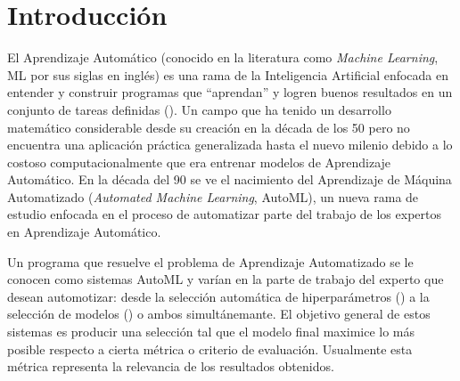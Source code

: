\chapter*{Introducción}\label{chapter:introduction}


El Aprendizaje Autom\'atico (conocido en la literatura como \textit{Machine Learning}, ML por sus siglas en ingl\'es) es una rama de la Inteligencia Artificial enfocada en entender y construir programas que ``aprendan'' y logren buenos resultados en un conjunto de tareas definidas (\cite{mitchell1990machine}). Un campo que ha tenido un desarrollo matem\'atico considerable desde su creaci\'on en la d\'ecada de los 50 pero no encuentra una aplicaci\'on pr\'actica generalizada hasta el nuevo milenio debido a lo costoso computacionalmente que era entrenar modelos de Aprendizaje Autom\'atico. En la d\'ecada del 90 se ve el nacimiento del Aprendizaje de M\'aquina Automatizado (\textit{Automated Machine Learning}, AutoML), un nueva rama de estudio enfocada en el proceso de automatizar parte del trabajo de los expertos en Aprendizaje Autom\'atico.

Un programa que resuelve el problema de Aprendizaje Automatizado se le conocen como sistemas AutoML y var\'ian en la parte de trabajo del experto que desean automotizar: desde la selecci\'on autom\'atica de hiperpar\'ametros (\cite{feurer2019hyperparameter}) a  la selecci\'on de modelos (\cite{thornton2013auto}) o ambos  simult\'anemante. El objetivo general de estos sistemas es producir una selecci\'on tal que el modelo final maximice lo m\'as posible respecto a cierta m\'etrica o criterio de evaluaci\'on. Usualmente esta m\'etrica representa la relevancia de los resultados obtenidos.


